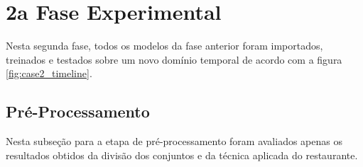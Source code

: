 \documentclass[	12pt, Times, openright, twoside, a4paper, english, brazil]{abntex2}
\begin{document}
    \section{2a Fase Experimental}
        
        \begin{figure}[H]
        \end{figure}
	    Nesta segunda fase, todos os modelos da fase anterior foram importados, treinados e testados sobre um novo domínio temporal de acordo com a figura \ref{fig:case2_timeline}.
        
	    \subsection{Pré-Processamento}
	        Nesta subseção para a etapa de pré-processamento foram avaliados apenas os resultados obtidos da divisão dos conjuntos e da técnica aplicada do restaurante.
	        
\end{document}
